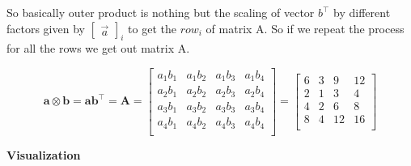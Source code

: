 \documentclass{article}
\begin{document}
So basically outer product is nothing but the scaling of vector $b^{\top}$ by different factors given by $\begin{bmatrix}
    \vec{a}
\end{bmatrix}_{i}$ to get the $row_{i}$ of matrix A. So if we repeat the process for all the rows we get out matrix A.

$$
{\displaystyle 
    \mathbf {a} \otimes \mathbf {b} =\mathbf{a}\mathbf{b^{\top}} =\mathbf {A} =
    {\begin{bmatrix} 
        a_{1}b_{1} & a_{1}b_{2} & a_{1}b_{3} & a_{1}b_{4} \\ 
        a_{2}b_{1} & a_{2}b_{2} & a_{2}b_{3} & a_{2}b_{4} \\
        a_{3}b_{1} & a_{3}b_{2} & a_{3}b_{3} & a_{3}b_{4} \\
        a_{4}b_{1} & a_{4}b_{2} & a_{4}b_{3} & a_{4}b_{4} \\
    \end{bmatrix}} = 
    {\begin{bmatrix} 
        6 & 3 & 9 & 12 \\
        2 & 1 & 3 & 4 \\
        4 & 2 & 6 & 8 \\
        8 & 4 & 12 & 16 \\
    \end{bmatrix}}
}
$$ 

\begin{center}
    \textbf{\large Visualization}
\end{center}
\end{document}
